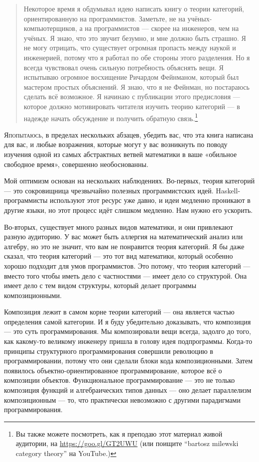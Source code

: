 
\begin{quote}
  Некоторое время я обдумывал идею написать книгу о теории категорий, 
  ориентированную на программистов. Заметьте, не на учёных-компьютерщиков,
  а на программистов --- скорее на инженеров, чем на учёных. Я знаю, что 
  это звучит безумно, и мне должно быть страшно. Я не могу отрицать, что 
  существует огромная пропасть между наукой и инженерией, потому что я 
  работал по обе стороны этого разделения. Но я всегда чувствовал очень 
  сильную потребность объяснять вещи. Я испытываю огромное восхищение 
  Ричардом Фейнманом, который был мастером простых объяснений. Я знаю, 
  что я не Фейнман, но постараюсь сделать всё возможное. Я начинаю с 
  публикации этого предисловия --- которое должно мотивировать читателя 
  изучить теорию категорий --- в надежде начать обсуждение и получить 
  обратную связь.\footnote{
    Вы также можете посмотреть, как я преподаю этот материал живой аудитории, на
    \href{https://goo.gl/GT2UWU}{https://goo.gl/GT2UWU} (или поищите
    ``bartosz milewski category theory'' на YouTube.)}
\end{quote}

\lettrine[lhang=0.17]{Я}{попытаюсь}, в пределах нескольких абзацев,
убедить вас, что эта книга написана для вас, и любые возражения, которые 
могут у вас возникнуть по поводу изучения одной из самых абстрактных 
ветвей математики в ваше «обильное свободное время», совершенно необоснованны.

Мой оптимизм основан на нескольких наблюдениях. Во-первых, теория категорий 
--- это сокровищница чрезвычайно полезных программистских идей. Haskell-программисты 
используют этот ресурс уже давно, и идеи медленно проникают в другие языки, 
но этот процесс идёт слишком медленно. Нам нужно его ускорить.

Во-вторых, существует много разных видов математики, и они привлекают разную 
аудиторию. У вас может быть аллергия на математический анализ или алгебру, 
но это не значит, что вам не понравится теория категорий. Я бы даже сказал, 
что теория категорий --- это тот вид математики, который особенно хорошо 
подходит для умов программистов. Это потому, что теория категорий --- вместо 
того чтобы иметь дело с частностями --- имеет дело со структурой. Она имеет 
дело с тем видом структуры, который делает программы композиционными.

Композиция лежит в самом корне теории категорий --- она является частью 
определения самой категории. И я буду убедительно доказывать, что композиция 
--- это суть программирования. Мы композировали вещи всегда, задолго до того, 
как какому-то великому инженеру пришла в голову идея подпрограммы. Когда-то 
принципы структурного программирования совершили революцию в программировании, 
потому что они сделали блоки кода композиционными. Затем появилось объектно-ориентированное 
программирование, которое всё о композиции объектов. Функциональное программирование 
--- это не только композиция функций и алгебраических типов данных --- оно делает 
параллелизм композиционным --- то, что практически невозможно с другими парадигмами 
программирования.


